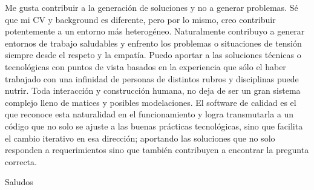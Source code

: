 \documentclass[12pt, a4paper]{awesome-cv}
\begin{document}
\begin{cvletter}
    Me gusta contribuir a la generación de soluciones y no a generar problemas.
    Sé que mi CV y background es diferente, pero por lo mismo, creo contribuir
    potentemente a un entorno más heterogéneo. Naturalmente contribuyo a generar
    entornos de trabajo saludables y enfrento los problemas o situaciones de
    tensión siempre desde el respeto y la empatía. Puedo aportar a las
    soluciones técnicas o tecnológicas con puntos de vista basados en la
    experiencia que sólo el haber trabajado con una infinidad de personas de
    distintos rubros y disciplinas puede nutrir. Toda interacción y construcción
    humana, no deja de ser un gran sistema complejo lleno de matices y posibles
    modelaciones. El software de calidad es el que reconoce esta naturalidad en
    el funcionamiento y logra transmutarla a un código que no solo se ajuste a
    las buenas prácticas tecnológicas, sino que facilita el cambio iterativo en
    esa dirección; aportando las soluciones que no solo responden a
    requerimientos sino que también contribuyen a encontrar la pregunta
    correcta.

    Saludos

\end{cvletter}


\end{document}
